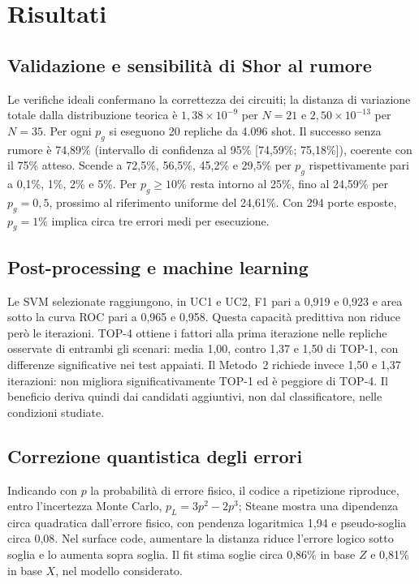 \section{Risultati}

\subsection{Validazione e sensibilità di Shor al rumore}

Le verifiche ideali confermano la correttezza dei circuiti; la distanza di variazione totale
dalla distribuzione teorica è \(1{,}38 \times 10^{-9}\) per \(N = 21\) e
\(2{,}50 \times 10^{-13}\) per \(N = 35\). Per ogni \(p_g\) si eseguono 20 repliche da 4.096
shot. Il successo senza rumore è 74,89\% (intervallo di confidenza al 95\%
{[}74,59\%; 75,18\%{]}), coerente con il 75\% atteso. Scende a 72,5\%, 56,5\%, 45,2\% e
29,5\% per \(p_g\) rispettivamente pari a 0,1\%, 1\%, 2\% e 5\%. Per \(p_g \geq 10\%\) resta
intorno al 25\%, fino al 24,59\% per \(p_g = 0{,}5\), prossimo al riferimento uniforme del
24,61\%. Con 294 porte esposte, \(p_g = 1\%\) implica circa tre errori medi per esecuzione.

\subsection{Post-processing e machine learning}

Le SVM selezionate raggiungono, in UC1 e UC2, F1 pari a 0,919 e 0,923 e area sotto la curva
ROC pari a 0,965 e 0,958. Questa capacità predittiva non riduce però le iterazioni. TOP-4
ottiene i fattori alla prima iterazione nelle repliche osservate di entrambi gli scenari:
media 1,00, contro 1,37 e 1,50 di TOP-1, con differenze significative nei test appaiati. Il
Metodo~2 richiede invece 1,50 e 1,37 iterazioni: non migliora significativamente TOP-1 ed è
peggiore di TOP-4. Il beneficio deriva quindi dai candidati aggiuntivi, non dal
classificatore, nelle condizioni studiate.

\subsection{Correzione quantistica degli errori}\label{sec:risultati-qec}

Indicando con \(p\) la probabilità di errore fisico, il codice a ripetizione riproduce, entro
l'incertezza Monte Carlo, \(p_L = 3p^2 - 2p^3\); Steane mostra una dipendenza circa
quadratica dall'errore fisico, con pendenza logaritmica 1,94 e pseudo-soglia circa 0,08. Nel
surface code, aumentare la distanza riduce l'errore logico sotto soglia e lo aumenta sopra
soglia. Il fit stima soglie circa 0,86\% in base \(Z\) e 0,81\% in base \(X\), nel modello
considerato.

